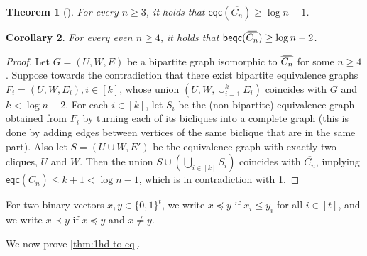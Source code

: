 \documentclass{article}
\newtheorem{theorem}{Theorem}\newtheorem{lemma}[theorem]{Lemma}\newtheorem{proposition}[theorem]{Proposition}\newtheorem{corollary}[theorem]{Corollary}\newtheorem{definition}[theorem]{Definition}\newtheorem{claim}[theorem]{Claim}\newtheorem{remark}[theorem]{Remark}\newtheorem{observation}[theorem]{Observation}\newtheorem{conjecture}[theorem]{Conjecture}\newtheorem{example}[theorem]{Example}
\newcommand{\eqc}{\mathsf{eqc}}
\newcommand{\beqc}{\mathsf{beqc}}
\newcommand\doverline[1]{%
  \setbox0=\hbox{$\!\overline{#1}\!$}%
  \ht0=\dimexpr\ht0-.2ex\relax%
  \,\overline{\copy0}\,%
}
\newcommand{\bc}[1]{\doverline{#1}} %
\begin{document}
\begin{theorem}[\cite{LNP80,Alon86}]\label{equivalenceCoveringOfCycles}
	For every $n \geq 3$, it holds that $\eqc(\overline{C_n}) \geq \log n - 1$.
\end{theorem}

\begin{corollary}\label{bipEquivalenceCoveringOfCycles}
	For every even $n \geq 4$, it holds that $\beqc(\bc{C_n}) \geq \log n -2$.
\end{corollary}
\begin{proof}
	Let $G=(U,W,E)$ be a bipartite graph isomorphic to $\bc{C_n}$ for some $n \geq 4$.
  Suppose towards the contradiction that there exist bipartite equivalence graphs $F_i=(U,W,E_i), i
\in [k]$, whose union $(U,W, \cup_{i=1}^k E_i)$ coincides with $G$ and $k < \log n - 2$. For each $i
\in [k]$, let $S_i$ be the (non-bipartite) equivalence graph obtained from $F_i$ by turning each of its bicliques
into a complete graph (this is done by adding edges between vertices of the same biclique that are
in the same part). Also let $S=(U \cup W, E')$ be the equivalence graph with exactly two cliques,
$U$ and $W$.  Then the union $S \cup \left(\bigcup_{i \in [k]} S_i\right)$ coincides with $\overline{C_n}$,
implying $\eqc(\overline{C_n}) \leq k +1 < \log n - 1$, which is in contradiction with
\cref{equivalenceCoveringOfCycles}.
\end{proof}

For two binary vectors $x,y \in \{0,1\}^t$, we write $x \preceq y$ if $x_i \leq y_i$ for all $i \in [t]$, and we write $x \prec y$ if $x \preceq y$ and $x \neq y$.

We now prove \cref{thm:1hd-to-eq}.
\end{document}
